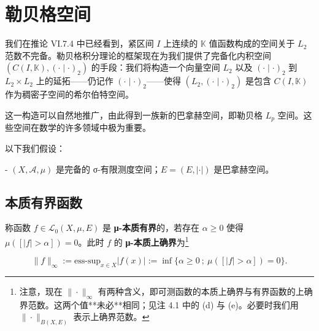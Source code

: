 \section{勒贝格空间}

我们在推论 VI.7.4 中已经看到，紧区间 $ I $ 上连续的 $ \mathbb{K} $ 值函数构成的空间关于 $ L_2 $ 范数不完备。勒贝格积分理论的框架现在为我们提供了完备化内积空间 $ (C(I,\mathbb{K}),(\cdot\mid\cdot)_2) $ 的手段：我们将构造一个向量空间 $ L_2 $ 以及 $ (\cdot\mid\cdot)_2 $ 到 $ L_2 \times L_2 $ 上的延拓——仍记作 $ (\cdot\mid\cdot)_2 $——使得 $ (L_2,(\cdot\mid\cdot)_2) $ 是包含 $ C(I,\mathbb{K}) $ 作为稠密子空间的希尔伯特空间。

这一构造可以自然地推广，由此得到一族新的巴拿赫空间，即勒贝格 $ L_p $ 空间。这些空间在数学的许多领域中极为重要。

以下我们假设：

- $ (X,\mathcal{A},\mu) $ 是完备的 σ-有限测度空间；$ E = (E,|\cdot|) $ 是巴拿赫空间。

\subsection*{本质有界函数}

称函数 $ f \in \mathcal{L}_0(X,\mu,E) $ 是 \textbf{μ-本质有界}的，若存在 $ \alpha \ge 0 $ 使得 $ \mu([|f| > \alpha]) = 0 $。此时 $ f $ 的 \textbf{μ-本质上确界}为\footnote{注意，现在 $ \|\cdot\|_\infty $ 有两种含义，即可测函数的本质上确界与有界函数的上确界范数。这两个值**未必**相同；见注 4.1 中的 (d) 与 (e)。必要时我们用 $ \|\cdot\|_{B(X,E)} $ 表示上确界范数。}

\[
\|f\|_\infty := \text{ess-sup}_{x \in X}|f(x)| := \inf\{\alpha \ge 0\ ;\ \mu([|f| > \alpha]) = 0\} .
\]

